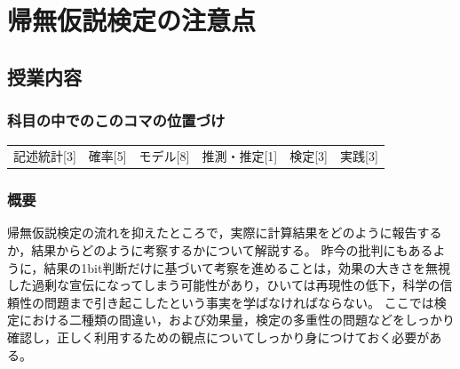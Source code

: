 \section{帰無仮説検定の注意点}
\label{s19_NHST2}

\subsection{授業内容}
\subsubsection{科目の中でのこのコマの位置づけ}
\begin{tabular}[t]{cccccc}
	記述統計[3] & 確率[5] & モデル[8] & 推測・推定[1] & 検定[3] & 実践[3]
\end{tabular}

\subsubsection{概要}
帰無仮説検定の流れを抑えたところで，実際に計算結果をどのように報告するか，結果からどのように考察するかについて解説する。
昨今の批判にもあるように，結果の1bit判断だけに基づいて考察を進めることは，効果の大きさを無視した過剰な宣伝になってしまう可能性があり，ひいては再現性の低下，科学の信頼性の問題まで引き起こしたという事実を学ばなければならない。
ここでは検定における二種類の間違い，および効果量，検定の多重性の問題などをしっかり確認し，正しく利用するための観点についてしっかり身につけておく必要がある。

